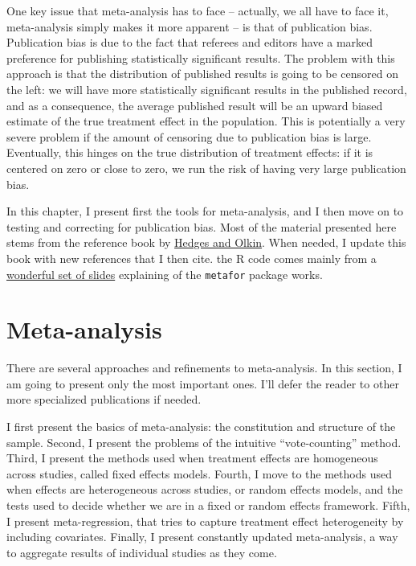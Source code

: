 \documentclass[
]{book}
\theoremstyle{definition}
\theoremstyle{definition}
\theoremstyle{definition}
\theoremstyle{definition}
\theoremstyle{remark}
\begin{document}
One key issue that meta-analysis has to face -- actually, we all have to face it, meta-analysis simply makes it more apparent -- is that of publication bias.
Publication bias is due to the fact that referees and editors have a marked preference for publishing statistically significant results.
The problem with this approach is that the distribution of published results is going to be censored on the left: we will have more statistically significant results in the published record, and as a consequence, the average published result will be an upward biased estimate of the true treatment effect in the population.
This is potentially a very severe problem if the amount of censoring due to publication bias is large.
Eventually, this hinges on the true distribution of treatment effects: if it is centered on zero or close to zero, we run the risk of having very large publication bias.

In this chapter, I present first the tools for meta-analysis, and I then move on to testing and correcting for publication bias.
Most of the material presented here stems from the reference book by \href{https://www.sciencedirect.com/book/9780080570655/statistical-methods-for-meta-analysis}{Hedges and Olkin}.
When needed, I update this book with new references that I then cite.
the R code comes mainly from a \href{http://www.edii.uclm.es/~useR-2013/Tutorials/kovalchik/kovalchik_meta_tutorial.pdf}{wonderful set of slides} explaining of the \texttt{metafor} package works.

\hypertarget{meta-analysis}{%
\section{Meta-analysis}\label{meta-analysis}}

There are several approaches and refinements to meta-analysis.
In this section, I am going to present only the most important ones.
I'll defer the reader to other more specialized publications if needed.

I first present the basics of meta-analysis: the constitution and structure of the sample.
Second, I present the problems of the intuitive ``vote-counting'' method.
Third, I present the methods used when treatment effects are homogeneous across studies, called fixed effects models.
Fourth, I move to the methods used when effects are heterogeneous across studies, or random effects models, and the tests used to decide whether we are in a fixed or random effects framework.
Fifth, I present meta-regression, that tries to capture treatment effect heterogeneity by including covariates.
Finally, I present constantly updated meta-analysis, a way to aggregate results of individual studies as they come.
\end{document}
